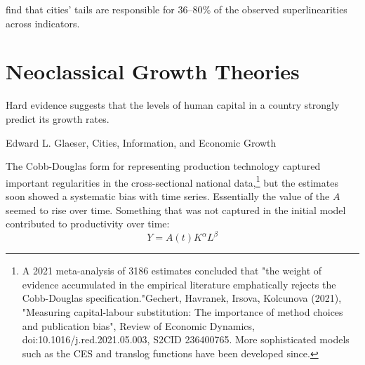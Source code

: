 

\cite{arvidssonUrbanScalingLaws2023} find that cities’ tails are responsible for 36–80\% of the observed superlinearities across indicators. 

\section{Neoclassical Growth Theories} 

\label{section-growth}
\epigraph{Hard evidence suggests that the levels of human capital in a country strongly predict its growth rates.}{Edward L. Glaeser, Cities, Information, and Economic Growth}

The \gls{Cobb-Douglas} form for representing production technology captured  important regularities in the cross-sectional national data,\footnote{ A 2021 meta-analysis of 3186 estimates concluded that "the weight of evidence accumulated in the empirical literature emphatically rejects the Cobb-Douglas specification."Gechert, Havranek, Irsova, Kolcunova (2021), "Measuring capital-labour substitution: The importance of method choices and publication bias", Review of Economic Dynamics, doi:10.1016/j.red.2021.05.003, S2CID 236400765. More sophisticated models  such as the CES and translog functions have been developed  since.} 
but the estimates soon showed a systematic bias with time series. Essentially the value of the $A$ seemed to rise over time. Something that was not captured in the initial model  contributed to productivity over time: 
 \[Y=A(t)K^\alpha L^\beta\]


